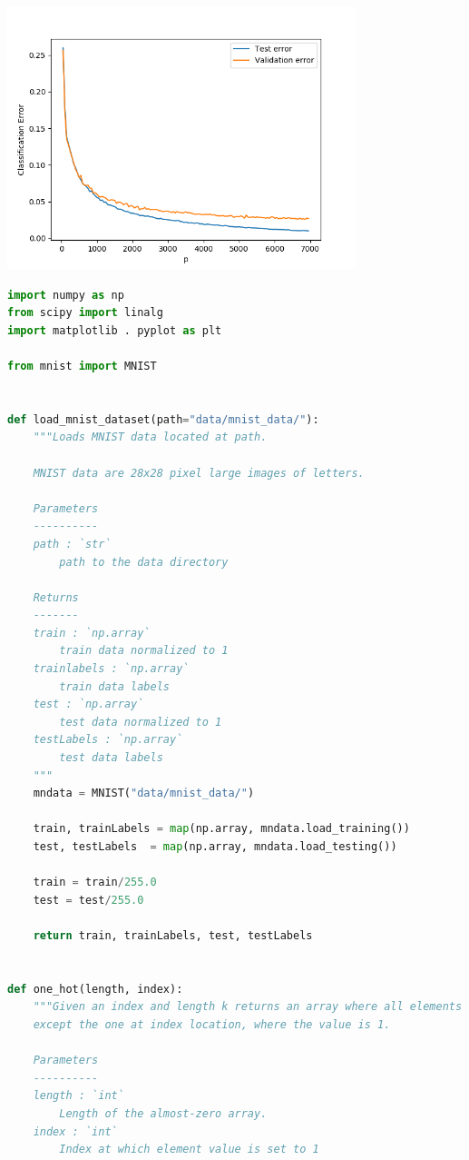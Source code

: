 \documentclass{article}
\newcommand{\1}{\mathbf{1}}
\begin{document}
\begin{enumerate}
    \begin{center}
        \includegraphics[width=4in]{HW1/HW1_plots/ClassificationError.png}
    \end{center}    
    
\begin{lstlisting}[language=Python]
import numpy as np
from scipy import linalg
import matplotlib . pyplot as plt

from mnist import MNIST


def load_mnist_dataset(path="data/mnist_data/"):
    """Loads MNIST data located at path.

    MNIST data are 28x28 pixel large images of letters.

    Parameters
    ----------
    path : `str`
        path to the data directory

    Returns
    -------
    train : `np.array`
        train data normalized to 1
    trainlabels : `np.array`
        train data labels
    test : `np.array`
        test data normalized to 1
    testLabels : `np.array`
        test data labels
    """
    mndata = MNIST("data/mnist_data/")

    train, trainLabels = map(np.array, mndata.load_training())
    test, testLabels  = map(np.array, mndata.load_testing())

    train = train/255.0
    test = test/255.0

    return train, trainLabels, test, testLabels


def one_hot(length, index):
    """Given an index and length k returns an array where all elements are zero
    except the one at index location, where the value is 1.

    Parameters
    ----------
    length : `int`
        Length of the almost-zero array.
    index : `int`
        Index at which element value is set to 1


\end{lstlisting}
\end{enumerate}
\end{document}

